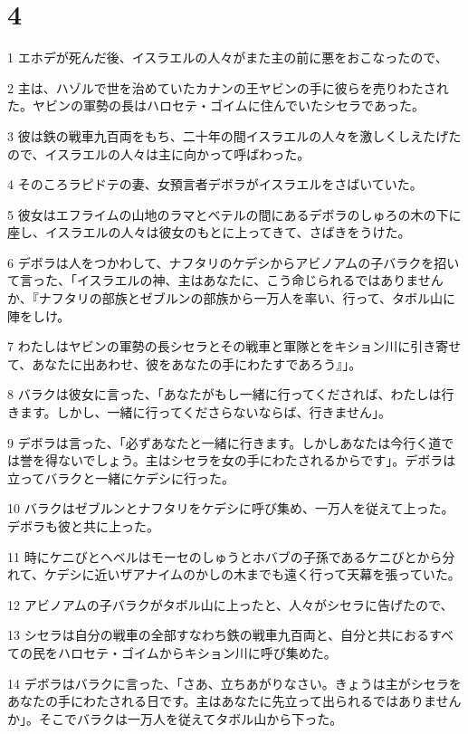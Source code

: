 \chapter{4}

\par 1 エホデが死んだ後、イスラエルの人々がまた主の前に悪をおこなったので、
\par 2 主は、ハゾルで世を治めていたカナンの王ヤビンの手に彼らを売りわたされた。ヤビンの軍勢の長はハロセテ・ゴイムに住んでいたシセラであった。
\par 3 彼は鉄の戦車九百両をもち、二十年の間イスラエルの人々を激しくしえたげたので、イスラエルの人々は主に向かって呼ばわった。
\par 4 そのころラピドテの妻、女預言者デボラがイスラエルをさばいていた。
\par 5 彼女はエフライムの山地のラマとベテルの間にあるデボラのしゅろの木の下に座し、イスラエルの人々は彼女のもとに上ってきて、さばきをうけた。
\par 6 デボラは人をつかわして、ナフタリのケデシからアビノアムの子バラクを招いて言った、「イスラエルの神、主はあなたに、こう命じられるではありませんか、『ナフタリの部族とゼブルンの部族から一万人を率い、行って、タボル山に陣をしけ。
\par 7 わたしはヤビンの軍勢の長シセラとその戦車と軍隊とをキション川に引き寄せて、あなたに出あわせ、彼をあなたの手にわたすであろう』」。
\par 8 バラクは彼女に言った、「あなたがもし一緒に行ってくだされば、わたしは行きます。しかし、一緒に行ってくださらないならば、行きません」。
\par 9 デボラは言った、「必ずあなたと一緒に行きます。しかしあなたは今行く道では誉を得ないでしょう。主はシセラを女の手にわたされるからです」。デボラは立ってバラクと一緒にケデシに行った。
\par 10 バラクはゼブルンとナフタリをケデシに呼び集め、一万人を従えて上った。デボラも彼と共に上った。
\par 11 時にケニびとヘベルはモーセのしゅうとホバブの子孫であるケニびとから分れて、ケデシに近いザアナイムのかしの木までも遠く行って天幕を張っていた。
\par 12 アビノアムの子バラクがタボル山に上ったと、人々がシセラに告げたので、
\par 13 シセラは自分の戦車の全部すなわち鉄の戦車九百両と、自分と共におるすべての民をハロセテ・ゴイムからキション川に呼び集めた。
\par 14 デボラはバラクに言った、「さあ、立ちあがりなさい。きょうは主がシセラをあなたの手にわたされる日です。主はあなたに先立って出られるではありませんか」。そこでバラクは一万人を従えてタボル山から下った。
